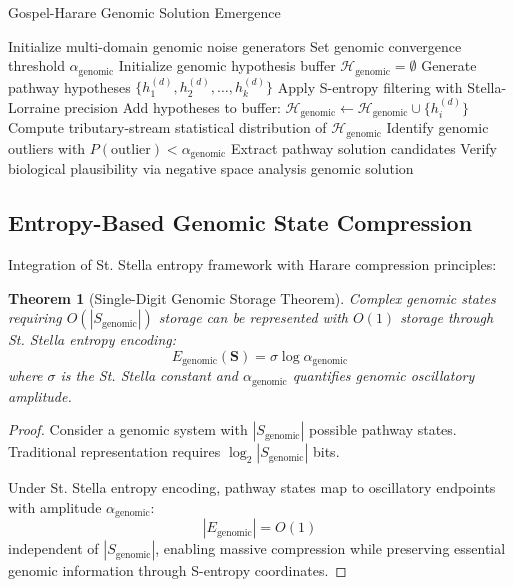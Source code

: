 \documentclass[12pt,a4paper]{article}
\newtheorem{theorem}{Theorem}[section]
\begin{document}
\begin{algorithm}
\caption{Gospel-Harare Genomic Solution Emergence}
\begin{algorithmic}[1]
\State Initialize multi-domain genomic noise generators
\State Set genomic convergence threshold $\alpha_{\text{genomic}}$
\State Initialize genomic hypothesis buffer $\mathcal{H}_{\text{genomic}} = \emptyset$
        \State Generate pathway hypotheses $\{h_1^{(d)}, h_2^{(d)}, \ldots, h_k^{(d)}\}$
        \State Apply S-entropy filtering with Stella-Lorraine precision
        \State Add hypotheses to buffer: $\mathcal{H}_{\text{genomic}} \leftarrow \mathcal{H}_{\text{genomic}} \cup \{h_i^{(d)}\}$
    \EndFor
    \State Compute tributary-stream statistical distribution of $\mathcal{H}_{\text{genomic}}$
    \State Identify genomic outliers with $P(\text{outlier}) < \alpha_{\text{genomic}}$
        \State Extract pathway solution candidates
        \State Verify biological plausibility via negative space analysis
            \Return genomic solution
        \EndIf
    \EndIf
\EndWhile
\end{algorithmic}
\end{algorithm}

\subsection{Entropy-Based Genomic State Compression}

Integration of St. Stella entropy framework with Harare compression principles:

\begin{theorem}[Single-Digit Genomic Storage Theorem]
Complex genomic states requiring $O(|S_{\text{genomic}}|)$ storage can be represented with $O(1)$ storage through St. Stella entropy encoding:
$$E_{\text{genomic}}(\mathbf{S}) = \sigma \log \alpha_{\text{genomic}}$$
where $\sigma$ is the St. Stella constant and $\alpha_{\text{genomic}}$ quantifies genomic oscillatory amplitude.
\end{theorem}

\begin{proof}
Consider a genomic system with $|S_{\text{genomic}}|$ possible pathway states. Traditional representation requires $\log_2|S_{\text{genomic}}|$ bits.

Under St. Stella entropy encoding, pathway states map to oscillatory endpoints with amplitude $\alpha_{\text{genomic}}$:
$$|E_{\text{genomic}}| = O(1)$$
independent of $|S_{\text{genomic}}|$, enabling massive compression while preserving essential genomic information through S-entropy coordinates.
\end{proof}
\end{document}
